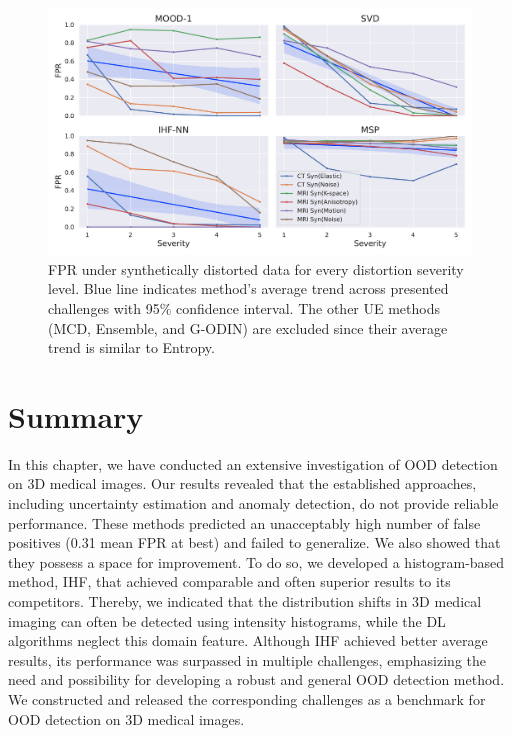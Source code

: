 \begin{landscape}
\begin{figure}[p]
	\centering
	\includegraphics[width=\linewidth]{Dissertation/Figures/5_ood_bench/fpr_sev.pdf}
	\caption{FPR under synthetically distorted data for every distortion severity level. Blue line indicates method's average trend across presented challenges with 95\% confidence interval. The other UE methods (MCD, Ensemble, and G-ODIN) are excluded since their average trend is similar to Entropy.}
	\label{fig:fpr_sev}
\end{figure}
\end{landscape}



\section{Summary}

In this chapter, we have conducted an extensive investigation of OOD detection on 3D medical images. Our results revealed that the established approaches, including uncertainty estimation and anomaly detection, do not provide reliable performance. These methods predicted an unacceptably high number of false positives (0.31 mean FPR at best) and failed to generalize. We also showed that they possess a space for improvement. To do so, we developed a histogram-based method, IHF, that achieved comparable and often superior results to its competitors. Thereby, we indicated that the distribution shifts in 3D medical imaging can often be detected using intensity histograms, while the DL algorithms neglect this domain feature. Although IHF achieved better average results, its performance was surpassed in multiple challenges, emphasizing the need and possibility for developing a robust and general OOD detection method. We constructed and released the corresponding challenges as a benchmark for OOD detection on 3D medical images.%





